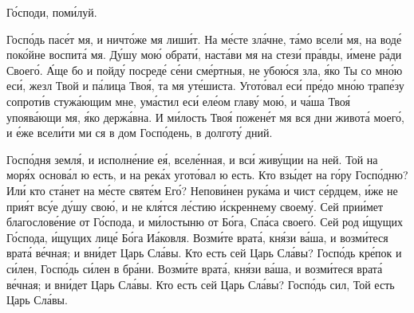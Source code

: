 \begin{mymulticols}


\MolitvamiSviatyhOtecNashih

\TsariuNebesnyj

\TrisviatoePoOtcheNash

Г\'{о}споди, пом\'{и}луй.

\slavainynen

\priiditepoklonimsia


Госп\'{о}дь пас\'{е}т мя, и ничт\'{о}же мя лиш\'{и}т. На м\'{е}сте зл\'{а}чне, т\'{а}мо всел\'{и} мя, на вод\'{е} пок\'{о}йне воспит\'{а} мя. Д\'{у}шу мо\'{ю} обрат\'{и}, наст\'{а}ви мя на стез\'{и} пр\'{а}вды, \'{и}мене р\'{а}ди Своег\'{о}. \'{А}ще бо и пойд\'{у} посред\'{е} с\'{е}ни см\'{е}ртныя, не убо\'{ю}ся зла, \'{я}ко Ты со мн\'{о}ю ес\'{и}, жезл Твой и п\'{а}лица Тво\'{я}, та мя ут\'{е}шиста. Угот\'{о}вал ес\'{и} пр\'{е}до мн\'{о}ю трап\'{е}зу сопрот\'{и}в стуж\'{а}ющим мне, ум\'{а}стил ес\'{и} ел\'{е}ом глав\'{у} мо\'{ю}, и ч\'{а}ша Тво\'{я} упояв\'{а}ющи мя, \'{я}ко держ\'{а}вна. И м\'{и}лость Тво\'{я} пожен\'{е}т мя вся дни живот\'{а} моег\'{о}, и \'{е}же всел\'{и}ти ми ся в дом Госп\'{о}день, в долгот\'{у} дний.


Госп\'{о}дня земл\'{я}, и исполн\'{е}ние е\'{я}, всел\'{е}нная, и вс\'{и} жив\'{у}щии на ней. Той на мор\'{я}х основ\'{а}л ю есть, и на рек\'{а}х угот\'{о}вал ю есть. Кто вз\'{ы}дет на г\'{о}ру Госп\'{о}дню? Ил\'{и} кто ст\'{а}нет на м\'{е}сте свят\'{е}м Ег\'{о}? Непов\'{и}нен рук\'{а}ма и чист с\'{е}рдцем, \'{и}же не при\'{я}т вс\'{у}е д\'{у}шу сво\'{ю}, и не кл\'{я}тся л\'{е}стию \'{и}скреннему своем\'{у}. Сей при\'{и}мет благослов\'{е}ние от Г\'{о}спода, и м\'{и}лостыню от Б\'{о}га, Сп\'{а}са своег\'{о}. Сей род \'{и}щущих Г\'{о}спода, \'{и}щущих лиц\'{е} Б\'{о}га И\'{а}ковля. Возм\'{и}те врат\'{а}, кн\'{я}зи в\'{а}ша, и возм\'{и}теся врат\'{а} в\'{е}чная; и вн\'{и}дет Царь Сл\'{а}вы. Кто есть сей Царь Сл\'{а}вы? Госп\'{о}дь кр\'{е}пок и с\'{и}лен, Госп\'{о}дь с\'{и}лен в бр\'{а}ни. Возм\'{и}те врат\'{а}, кн\'{я}зи в\'{а}ша, и возм\'{и}теся врат\'{а} в\'{е}чная; и вн\'{и}дет Царь Сл\'{а}вы. Кто есть сей Царь Сл\'{а}вы? Госп\'{о}дь сил, Той есть Царь Сл\'{а}вы.



\end{mymulticols}
